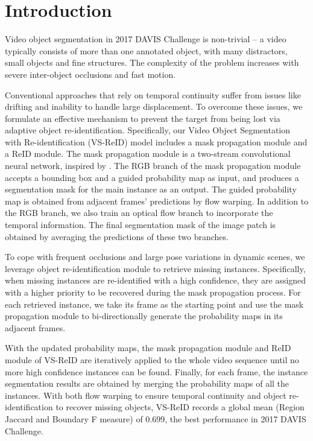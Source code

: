 
\section{Introduction}

Video object segmentation in 2017 DAVIS Challenge \cite{Pont-Tuset_arXiv_2017} is non-trivial -- a video typically consists of more than one annotated object, with many distractors, small objects and fine structures. The complexity of the problem increases with severe inter-object occlusions and fast motion.
	
Conventional approaches that rely on temporal continuity suffer from issues like drifting and inability to handle large displacement. To overcome these issues, we formulate an effective mechanism to prevent the target from being lost via adaptive object re-identification. Specifically, our Video Object Segmentation with Re-identification (VS-ReID) model includes a mask propagation module and a ReID module. The mask propagation module is a two-stream convolutional neural network, inspired by \cite{Perazzi2017}. The RGB branch of the mask propagation module accepts a bounding box and a guided probability map as input, and produces a segmentation mask for the main instance as an output. The guided probability map is obtained from adjacent frames' predictions by flow warping. In addition to the RGB branch, we also train an optical flow branch to incorporate the temporal information. The final segmentation mask of the image patch is obtained by averaging the predictions of these two branches. 

To cope with frequent occlusions and large pose variations in dynamic scenes, we leverage object re-identification module to retrieve missing instances. Specifically, when missing instances are re-identified with a high confidence, they are assigned with a higher priority to be recovered during the mask propagation process. For each retrieved instance, we take its frame as the starting point and use the mask propagation module to bi-directionally generate the probability maps in its adjacent frames. 

With the updated probability maps, the mask propagation module and ReID module of VS-ReID are iteratively applied to the whole video sequence until no more high confidence instances can be found.  Finally, for each frame, the instance segmentation results  are obtained by merging the probability maps of all the instances. With both flow warping to ensure temporal continuity and object re-identification to recover missing objects, VS-ReID records a global mean (Region Jaccard and Boundary F measure) of 0.699, the best performance in 2017 DAVIS Challenge.
